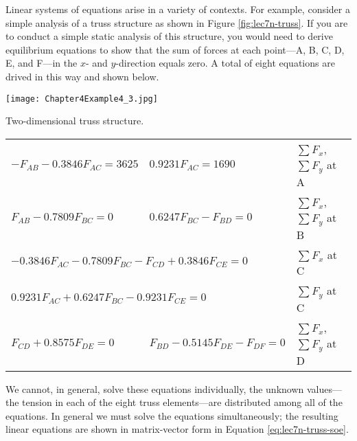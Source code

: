 Linear systems of equations arise in a variety of contexts.  For example, consider a simple analysis of a truss structure as shown in Figure \ref{fig:lec7n-truss}.  If you are to conduct a simple static analysis of this structure, you would need to derive equilibrium equations to show that the sum of forces at each point---A, B, C, D, E, and F---in the $x$- and $y$-direction equals zero.  A total of eight equations are drived in this way and shown below.
\begin{marginfigure}
\texttt{[image: Chapter4Example4\_3.jpg]}
\caption{Two-dimensional truss structure.}
\label{fig:lec7n-truss}
\end{marginfigure}
\begin{centering}
\begin{table}
\begin{tabular}{l l l}
$-F_{AB} - 0.3846F_{AC} = 3625$ & $0.9231F_{AC} = 1690$ & $\sum F_{x}$, $\sum {F_y}$ at A \\
$F_{AB} - 0.7809 F_{BC}=0$ & $0.6247F_{BC} - F_{BD} = 0$ & $\sum F_{x}$, $\sum {F_y}$ at B\\
\multicolumn{2}{l}{$- 0.3846F_{AC} - 0.7809F_{BC} - F_{CD} + 0.3846F_{CE}  = 0$} & $\sum F_{x}$ at C \\
\multicolumn{2}{l}{$0.9231F_{AC}+0.6247F_{BC} - 0.9231F_{CE} = 0$} & $\sum F_{y}$ at C \\
$F_{CD}+0.8575F_{DE} = 0$ & $F_{BD} - 0.5145F_{DE} - F_{DF} = 0$ & $\sum F_{x}$, $\sum {F_y}$ at D\\
\end{tabular}
\end{table}
\end{centering}
We cannot, in general, solve these equations individually, the unknown values---the tension in each of the eight truss elements---are distributed among all of the equations.  In general we must solve the equations simultaneously; the resulting linear equations are shown in matrix-vector form in Equation \ref{eq:lec7n-truss-soe}.
